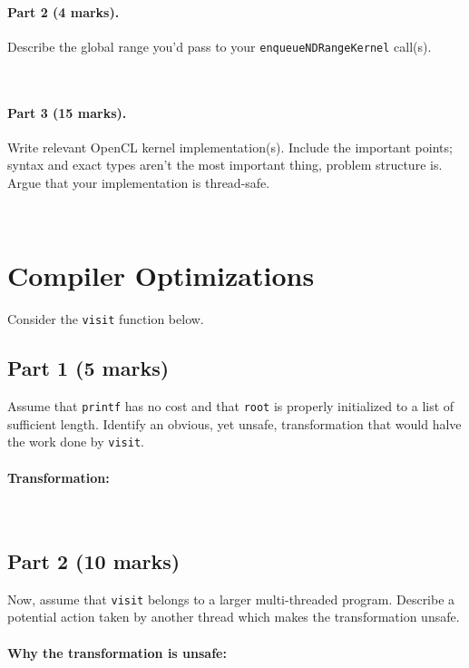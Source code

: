 \documentclass[12pt]{article}
\begin{document}
\paragraph{Part 2 (4 marks).} Describe the global range you'd pass
to your {\tt enqueueNDRangeKernel} call(s).

~\\[5em]

\paragraph{Part 3 (15 marks).} Write relevant
OpenCL kernel implementation(s). Include the important points; syntax
and exact types aren't the most important thing, problem structure is.
Argue that your implementation is thread-safe.

~\\[20em]


\section{Compiler Optimizations}

Consider the {\tt visit} function below.

\subsection*{Part 1 (5 marks)}
Assume that {\tt printf} has no cost and that {\tt root} is properly initialized to a list of sufficient length. Identify an obvious, yet unsafe, transformation that would halve the work done by {\tt visit}.

\paragraph{Transformation:} ~\\[2em]

\subsection*{Part 2 (10 marks)}
Now, assume that {\tt visit} belongs to a larger multi-threaded
program. Describe a potential action taken by another thread which
makes the transformation unsafe.

\paragraph{Why the transformation is unsafe:} ~\\[2em]
\end{document}
